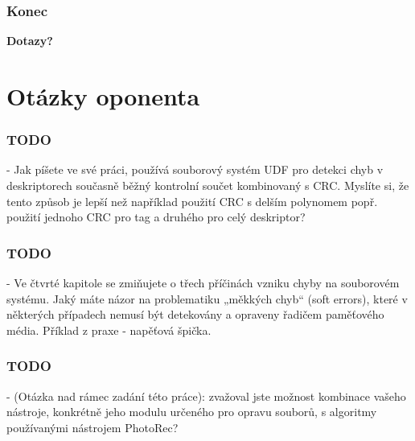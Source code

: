 \documentclass[aspectratio=169]{beamer}
\begin{document}
		\begin{frame}
			\frametitle{Konec}
			\center
			\vspace{40 pt}
			\Huge\textbf{Dotazy?}
		\end{frame}

    \section{Otázky oponenta}
        \begin{frame}
            \frametitle{TODO}
            - Jak píšete ve své práci, používá souborový systém UDF pro detekci chyb v deskriptorech současně běžný kontrolní součet kombinovaný s CRC. Myslíte si, že tento způsob je lepší než například použití CRC s delším polynomem popř. použití jednoho CRC pro tag a druhého pro celý deskriptor?
        \end{frame}
        \begin{frame}
            \frametitle{TODO}
            - Ve čtvrté kapitole se zmiňujete o třech příčinách vzniku chyby na souborovém systému. Jaký máte názor na problematiku „měkkých chyb“ (soft errors), které v některých případech nemusí být detekovány a opraveny řadičem paměťového média. Příklad z praxe - napěťová špička.
        \end{frame}
        \begin{frame}
            \frametitle{TODO}
            - (Otázka nad rámec zadání této práce): zvažoval jste možnost kombinace vašeho nástroje, konkrétně jeho modulu určeného pro opravu souborů, s algoritmy používanými nástrojem PhotoRec?

        \end{frame}
\end{document}
